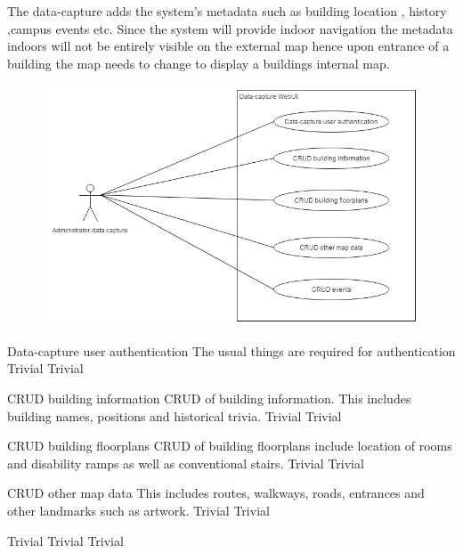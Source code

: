The data-capture adds the system's metadata such as building location , history ,campus events etc. Since the system will provide indoor navigation the metadata indoors will not be entirely visible on the external map hence upon entrance of a building the map needs to change to display a buildings internal map.
\mbox{}\\
\begin{figure}[h]
  \includegraphics[width=\textwidth]{diagrams/Specific_Requirements/data_capture_WebUI.png}
\end{figure}

\FuncReq
{Data-capture user authentication}
{The usual things are required for authentication}
{Trivial}
{Trivial}

\FuncReq
{CRUD building information}
{CRUD of building information. This includes building names, positions and historical trivia.}
{Trivial}
{Trivial}

\FuncReq
{CRUD building floorplans}
{CRUD of building floorplans include location of rooms and disability ramps as well as conventional stairs.}
{Trivial}
{Trivial}

\FuncReq
{CRUD other map data}
{This includes routes, walkways, roads, entrances and other landmarks such as artwork.}
{Trivial}
{Trivial}
 
{Trivial}
{Trivial}
{Trivial}
